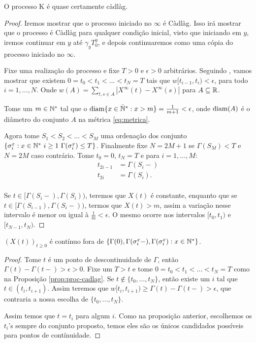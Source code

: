 \begin{proposicao}
  \label{prop:proc-cadlag}
  O processo K é quase certamente càdlàg.
\end{proposicao}
\begin{proof}

  Iremos mostrar que o processo iniciado no $\infty$ é Càdlàg. Isso
  irá mostrar que o processo é Càdlàg para qualquer condição inicial,
  visto que iniciando em $y$, iremos continuar em $y$ até $\gamma_y
  T^y_0$, e depois continuaremos como uma cópia do processo iniciado no
  $\infty$.

  Fixe uma realização do processo e fixe $T > 0$ e $\epsilon > 0$
  arbitrários. Seguindo \cite{billingsley:99}, vamos mostrar que
  existem $0 = t_0 < t_1 < \ldots < t_N = T$ tais que $w[t_{i-1}, t_i)
  < \epsilon$, para todo $i = 1, \ldots, N$. Onde $w(A) = \sum_{t, s
    \in A} |X^\infty(t) - X^\infty(s)|$ para $A \subseteq {\mathbb{R}}$.

  Tome um $m \in {\mathbb{N^*}}$ tal que o ${\mathrm{diam}}\{x \in {\mathbb{\bar{N}^*}}: x > m \} =
  \frac{1}{m+1} < \epsilon$, onde ${\mathrm{diam}}(A)$ é o diâmetro do conjunto
  $A$ na métrica \eqref{eq:metrica}.

  Agora tome $S_1 < S_2 < \ldots < S_M$ uma ordenação dos conjunto $\{
  \sigma^x_i: x \in {\mathbb{N^*}} \,\, i \geq 1 \,\, \Gamma(\sigma^x_i) \leq
  T\}$. Finalmente fixe $N = 2M+1$ se $\Gamma(S_M) < T$ e $N = 2M$
  caso contrário. Tome $t_0 = 0$, $t_N = T$ e para $i=1,\ldots, M$:
  \begin{align*}
    t_{2i-1} &= \Gamma(S_i-)\\
    t_{2i} &= \Gamma(S_i).\\
  \end{align*}

  Se $t \in [\Gamma(S_i-), \Gamma(S_i))$, teremos que
  $X(t)$ é constante, enquanto que se $t \in
  [\Gamma(S_{i-1}), \Gamma(S_{i}-))$, termos que
  $X(t) > m$, assim a variação nesse intervalo é menor ou igual
  à $\frac{1}{m} < \epsilon$. O mesmo ocorre nos intervalos $[t_0,
  t_1)$ e $[t_{N-1}, t_N)$.
\end{proof}

\begin{proposicao}
  \label{prop:proc-descontinuidades}
  $(X(t))_{t\geq 0}$ é \qc contínuo fora de $\{ \Gamma(0),
  \Gamma(\sigma_i^x-), \Gamma(\sigma_i^x): x \in {\mathbb{N^*}}\}$.
\end{proposicao}
\begin{proof}
  Tome $t$ é um ponto de descontinuidade de $\Gamma$, então $\Gamma(t) -
  \Gamma(t-) > \epsilon > 0$. Fixe um $T > t$ e tome $0 = t_0 < t_1 <
  \ldots < t_N = T$ como na Proposição \ref{prop:proc-cadlag}. Se
  $t \not\in \{t_0, \ldots, t_N\}$, então existe um $i$ tal que $t \in
  (t_i, t_{i+1})$. Assim teremos que $w[t_i, t_{i+1}) \geq \Gamma(t) -
  \Gamma(t-) > \epsilon$, que contraria a nossa escolha de $\{t_0,
  \ldots, t_N\}$.

  Assim temos que $t = t_i$ para algum $i$. Como na proposição
  anterior, escolhemos os $t_i$'s sempre do conjunto proposto, temos
  eles são os únicos candidados possíveis para pontos de contínuidade.
\end{proof}

